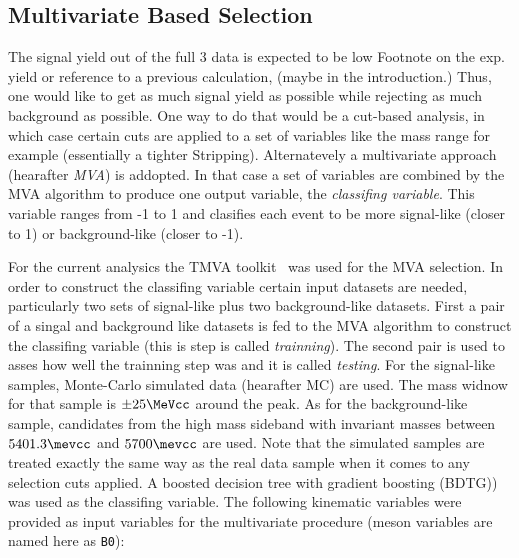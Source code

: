 

\subsection{Multivariate Based Selection}
\label{Multivariate_Based_Selection}

The \BsJpsiKst signal yield out of the full 3 \invfb data is expected to be low {\color{red} Footnote on the exp. yield or reference to a 
previous calculation, (maybe in the introduction.)} Thus, one would like to get as much signal yield as possible while rejecting as much background
as possible. One way to do that would be a cut-based analysis, in which case certain cuts are applied to a set of variables like the \Bs 
mass range for example (essentially a tighter Stripping). Alternatevely a multivariate approach (hearafter {\it MVA}) is addopted. 
In that case a set of variables are combined by the MVA algorithm to produce one output variable, the {\it classifing variable}. This variable ranges from -1 to 1 and 
clasifies each event to be more signal-like (closer to 1) or background-like (closer to -1).

For the current analysics the TMVA toolkit~\cite{TMVA} was used for the MVA selection. In order to construct the classifing variable certain 
input datasets are needed, particularly two sets of signal-like plus two background-like datasets. First a pair of a singal and background like
datasets is fed to the MVA algorithm to construct the classifing variable (this is step is called {\it trainning}). The second pair is used to
asses how well the trainning step was and it is called {\it testing}. For the signal-like samples, \BsJpsiKst Monte-Carlo simulated data (hearafter MC)
are used. The \Bs mass widnow for that sample is $\pm 25 \MeVcc$ around the \Bs peak. As for the background-like sample, candidates from the high mass sideband
with invariant masses between $5401.3\mevcc$ and $5700\mevcc$ are used. Note that the simulated samples are treated exactly the same way as the
real data sample when it comes to any selection cuts applied. A boosted decision tree with gradient boosting (BDTG){\color{red}{what is gradiaent boosting})}
was used as the classifing variable. The following kinematic variables were provided as input variables for the multivariate procedure (\Bs meson variables are 
named here as \texttt{B0}):

